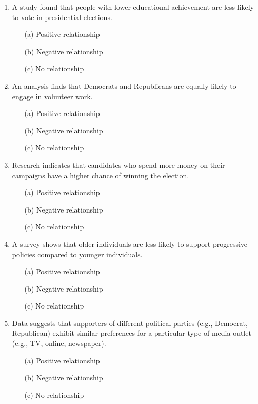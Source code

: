 \documentclass{article}
\begin{document}
\begin{enumerate}
    \item A study found that people with lower educational achievement are less likely to vote in presidential elections. 
    \begin{itemize}
        \item[(a)] Positive relationship
        \item[(b)] Negative relationship
        \item[(c)] No relationship
    \end{itemize}

    \item An analysis finds that Democrats and Republicans are equally likely to engage in volunteer work. 
    \begin{itemize}
        \item[(a)] Positive relationship
        \item[(b)] Negative relationship
        \item[(c)] No relationship
    \end{itemize}
    
    \item Research indicates that candidates who spend more money on their campaigns have a higher chance of winning the election.
    \begin{itemize}
        \item[(a)] Positive relationship
        \item[(b)] Negative relationship
        \item[(c)] No relationship
    \end{itemize}
    
    \item A survey shows that older individuals are less likely to support progressive policies compared to younger individuals.
    \begin{itemize}
        \item[(a)] Positive relationship
        \item[(b)] Negative relationship
        \item[(c)] No relationship
    \end{itemize}
    
    \item Data suggests that supporters of different political parties (e.g., Democrat, Republican) exhibit similar preferences for a particular type of media outlet (e.g., TV, online, newspaper).
    \begin{itemize}
        \item[(a)] Positive relationship
        \item[(b)] Negative relationship
        \item[(c)] No relationship
    \end{itemize}
    
\end{enumerate}
\end{document}
